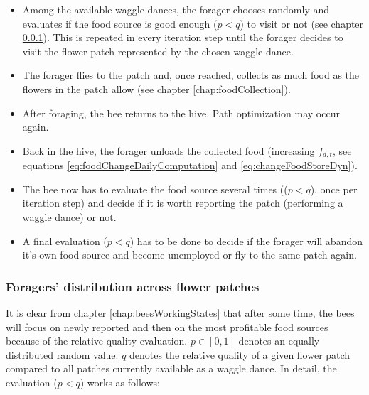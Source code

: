 			\begin{itemize}
				\item Among the available waggle dances, the forager chooses randomly and evaluates if the food source is good enough ($p < q$) to visit or not (see chapter \ref{chap:foragersDistribution}). This is repeated in every iteration step until the forager decides to visit the flower patch represented by the chosen waggle dance.
				\item The forager flies to the patch and, once reached, collects as much food as the flowers in the patch allow (see chapter \ref{chap:foodCollection}).
				\item After foraging, the bee returns to the hive. Path optimization may occur again.
				\item Back in the hive, the forager unloads the collected food (increasing $f_{d,t}$, see equations \ref{eq:foodChangeDailyComputation} and \ref{eq:changeFoodStoreDyn}).
				\item The bee now has to evaluate the food source several times (($p < q$), once per iteration step) and decide if it is worth reporting the patch (performing a waggle dance) or not.
				\item A final evaluation ($p < q$) has to be done to decide if the forager will abandon it's own food source and become unemployed or fly to the same patch again.
			\end{itemize}
					
		\subsubsection{Foragers' distribution across flower patches}
			\label{chap:foragersDistribution}
			It is clear from chapter \ref{chap:beesWorkingStates} that after some time, the bees will focus on newly reported and then on the most profitable food sources because of the relative quality evaluation. $p \in {[0,1]}$ denotes an equally distributed random value. $q$ denotes the relative quality of a given flower patch compared to all patches currently available as a waggle dance. In detail, the evaluation ($p < q$) works as follows:\\
			
